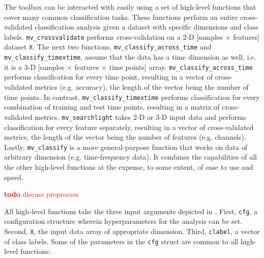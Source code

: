 \documentclass[utf8]{frontiersSCNS} %
\newcommand{\ttt}[1]{\texttt{#1}}
\newcommand{\todo}[1]{\textcolor{red}{\textbf{todo} #1}}
\begin{document}
The toolbox can be interacted with easily using a set of high-level functions that cover many common classification tasks. These functions perform an entire cross-validated classification analysis given a dataset with specific dimensions and class labels. \ttt{mv\_crossvalidate} performs  cross-validation on a 2-D [samples $\times$ features] dataset \ttt{X}. The next two functions, \ttt{mv\_classify\_across\_time}  and \ttt{mv\_classify\_timextime}, assume that the data has a time dimension as well, i.e. it is a 3-D [samples $\times$ features $\times$ time points] array. \ttt{mv\_classify\_across\_time} performs classification for every time point, resulting in a vector of cross-validated metrics (e.g. accuracy), the length of the vector being the number of time points. In contrast, \ttt{mv\_classify\_timextime} performs  classification for every combination of training and test time points, resulting in a matrix of cross-validated metrics. \ttt{mv\_searchlight} takes 2-D or 3-D input data and performs classification for every feature separately, resulting in a vector of cross-validated metrics, the length of the vector being the number of features (e.g. channels). Lastly, \ttt{mv\_classify} is a more general-purpose function that works on data of arbitrary dimension (e.g. time-frequency data). It combines the capabilities of all the other high-level functions at the expense, to some extent, of ease to use and speed.

\todo{ discuss preprocess}

All high-level functions take the three input arguments depicted in . First, \ttt{cfg}, a configuration structure wherein hyperparameters for the analysis can be set. Second, \ttt{X}, the input data array of appropriate dimension. Third, \ttt{clabel}, a vector of class labels.
Some of the parameters in the \ttt{cfg} struct are common  to all high-level functions:
\end{document}
